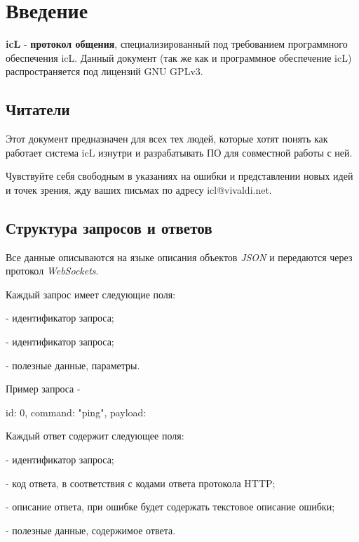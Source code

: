 \section{Введение}

\textbf{icL} - \textbf{протокол общения}, специализированный под требованием программного обеспечения icL. Данный документ (так же как и программное обеспечение icL) распространяется под лицензий GNU GPLv3.

\subsection{Читатели}

Этот документ предназначен для всех тех людей, которые хотят понять как работает система icL изнутри и разрабатывать ПО для совместной работы с ней.

Чувствуйте себя свободным в указаниях на ошибки и представлении новых идей и точек зрения, жду ваших письмах по адресу icl@vivaldi.net.

\subsection{Структура запросов и ответов}

Все данные описываются на языке описания объектов \textit{JSON} и передаются через протокол \textit{WebSockets}.

Каждый запрос имеет следующие поля:
\begin{icItems}
	\item {} - идентификатор запроса;
	\item {} - идентификатор запроса;
	\item {} - полезные данные, параметры.
\end{icItems}

Пример запроса -
\begin{jscode}
{
	id: 0,
	command: "ping",
	payload: {}
}
\end{jscode}

Каждый ответ содержит следующее поля:
\begin{icItems}
	\item {} - идентификатор запроса;
	\item {} - код ответа, в соответствия с кодами ответа протокола HTTP;
	\item {} - описание ответа, при ошибке будет содержать текстовое описание ошибки;
	\item {} - полезные данные, содержимое ответа.
\end{icItems}

